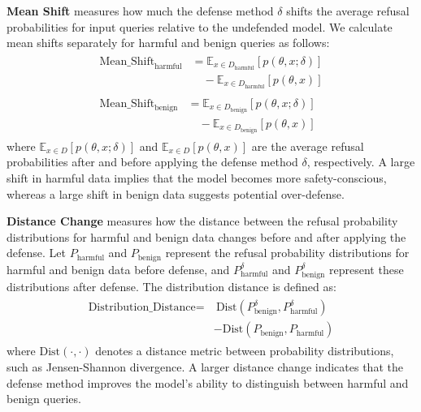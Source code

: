 \textbf{Mean Shift} measures how much the defense method \( \delta \) shifts the average refusal probabilities for input queries relative to the undefended model. We calculate mean shifts separately for harmful and benign queries as follows:
\begin{align*}
\begin{split}
\text{Mean\_Shift}_{\text{harmful}} &= \mathbb{E}_{x \in D_{\text{harmful}}}[p(\theta, x; \delta)] \\
&\quad - \mathbb{E}_{x \in D_{\text{harmful}}}[p(\theta, x)]
\end{split} \\
\begin{split}
\text{Mean\_Shift}_{\text{benign}} &= \mathbb{E}_{x \in D_{\text{benign}}}[p(\theta, x; \delta)] \\
&\quad - \mathbb{E}_{x \in D_{\text{benign}}}[p(\theta, x)]
\end{split}
\end{align*}
where \( \mathbb{E}_{x \in D}[p(\theta, x; \delta)] \) and \( \mathbb{E}_{x \in D}[p(\theta, x)] \) are the average refusal probabilities after and before applying the defense method $\delta$, respectively. A large shift in harmful data implies that the model becomes more safety-conscious, whereas a large shift in benign data suggests potential over-defense.  

\textbf{Distance Change} measures how the distance between the refusal probability distributions for harmful and benign data changes before and after applying the defense. Let \( P_{\text{harmful}} \) and \( P_{\text{benign}} \) represent the  refusal probability distributions for harmful and benign data before defense, and \( P^{\delta}_{\text{harmful}} \) and \( P^{\delta}_{\text{benign}} \) represent these distributions after defense. The distribution distance is defined as:
\begin{align*}
\begin{split}
\text{Distribution\_Distance} = &\ \text{Dist}(P_{\text{benign}}^{\delta}, P_{\text{harmful}}^{\delta}) \\
&- \text{Dist}(P_{\text{benign}}, P_{\text{harmful}})
\end{split}
\end{align*}
where \( \text{Dist}(\cdot, \cdot) \) denotes a distance metric between probability distributions, such as Jensen-Shannon divergence. A larger distance change indicates that the defense method improves the model's ability to distinguish between harmful and benign queries.


